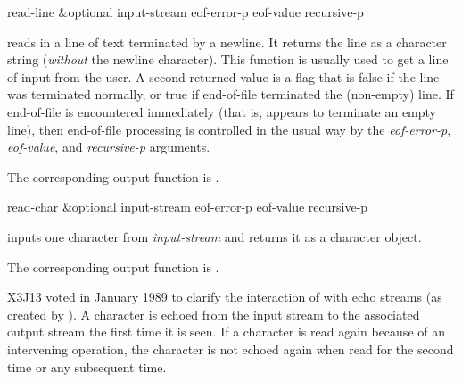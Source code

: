 \begin{defun}[Function]
read-line &optional input-stream eof-error-p eof-value recursive-p

 reads in a line of text terminated by a newline.
It returns the line as a character string ({\it without} the newline character).
This function is usually used to get a line of input from the user.
A second returned value is a flag that is false if the line was
terminated normally, or true if end-of-file terminated the (non-empty) line.
If end-of-file is encountered immediately (that is, appears to terminate
an empty line), then end-of-file processing is controlled in the
usual way by the {\it eof-error-p}, {\it eof-value}, and {\it recursive-p} arguments.

The corresponding output function is .
\end{defun}

\begin{defun}[Function]
read-char &optional input-stream eof-error-p eof-value recursive-p

 inputs one character from {\it input-stream} and returns it
as a character object.

The corresponding output function is .

\begin{new}
X3J13 voted in January 1989
to clarify the interaction of  with echo streams
(as created by ).  A character is echoed from the input stream
to the associated output stream the first time it is seen.
If a character is read again because of an intervening  operation,
the character is not echoed again when read for the second time or any subsequent time.
\end{new}
\end{defun}

